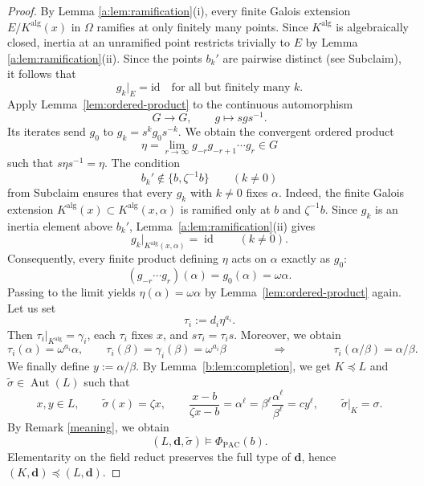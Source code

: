 \documentclass[11pt,a4paper]{amsart}
\theoremstyle{definition}
\newenvironment{claimproof}[1][Proof of Claim \theclaim.]
 {%
	\proof[#1]%
\renewcommand*\qedsymbol{$\square$\tiny{Claim \theclaim}}
}
{%
	\endproof%
}
\newcommand{\alg}{\mathrm{alg}}
\newcommand{\bd}{\boldsymbol d}
\DeclareMathOperator{\Aut}{Aut}
\DeclareMathOperator{\id}{id}
\begin{document}
\begin{proof}
\begin{claimproof}
\smallskip
By Lemma \ref{a:lem:ramification}(i), every finite Galois extension $E/K^\alg(x)$ in $\Omega$ ramifies at only
finitely many points. Since $K^\alg$ is algebraically closed, inertia at an
unramified point restricts trivially to $E$ by Lemma \ref{a:lem:ramification}(ii). Since the points $b_k'$ are pairwise distinct (see Subclaim), it follows that
\[
g_k|_E=\mathrm{id}\quad\text{for all but finitely many }k.
\]
Apply Lemma~\ref{lem:ordered-product} to the continuous
automorphism
\[
G\longrightarrow G,\qquad g\longmapsto sgs^{-1}.
\]
Its iterates send $g_0$ to $g_k=s^kg_0s^{-k}$.
We obtain the convergent ordered product
\[
\eta=\lim_{r\to\infty}g_{-r}g_{-r+1}\cdots g_r\in G
\]
such that $s\eta s^{-1}=\eta$. The condition
\[
b_k'\notin\{b,\zeta^{-1}b\}\qquad(k\ne0)
\]
from Subclaim ensures that every $g_k$ with $k\ne0$ fixes $\alpha$.
Indeed, the finite Galois extension
$K^{\alg}(x)\subset K^{\alg}(x,\alpha)$ is ramified only at $b$ and $\zeta^{-1}b$.
Since $g_k$ is an inertia element above $b_k'$,
Lemma~\ref{a:lem:ramification}(ii) gives
\[
g_k|_{K^{\alg}(x,\alpha)}=\id
\qquad(k\ne0).
\]
Consequently, every finite product defining $\eta$ acts on
$\alpha$ exactly as $g_0$:
\[
(g_{-r}\cdots g_r)(\alpha)=g_0(\alpha)=\omega\alpha.
\]
Passing to the limit yields $\eta(\alpha)=\omega\alpha$ by Lemma~\ref{lem:ordered-product} again.
\end{claimproof}
Let us set
\[
\tau_i:=d_i\eta^{a_i}.
\]
Then $\tau_i|_{K^{\alg}}=\gamma_i$, each $\tau_i$ fixes $x$, and
$s\tau_i=\tau_i s$. Moreover, we obtain
\[
\tau_i(\alpha)=\omega^{a_i}\alpha,\qquad
\tau_i(\beta)=\gamma_i(\beta)=\omega^{a_i}\beta\qquad \qquad \Longrightarrow\qquad \qquad
\tau_i(\alpha/\beta)=\alpha/\beta.
\]
We finally define $y:=\alpha/\beta$. By Lemma~\ref{b:lem:completion}, we get $K\preccurlyeq L$ and $\widetilde{\sigma}\in \Aut(L)$ such that
\[
x,y\in L,\qquad
\widetilde\sigma(x)=\zeta x,\qquad
\frac{x-b}{\zeta x-b}=\alpha ^\ell=\beta ^\ell\frac{\alpha ^\ell}{\beta ^\ell}=cy^\ell,\qquad \widetilde{\sigma}|_K=\sigma.
\]
By Remark \ref{meaning}, we obtain
\[
(L,\bd,\widetilde{\sigma})\models \Phi_{\mathrm{PAC}}(b).
\]
Elementarity on the
field reduct preserves the full type of $\bd$, hence $(K,\bd)\preccurlyeq(L,\bd)$.
\end{proof}
\end{document}
